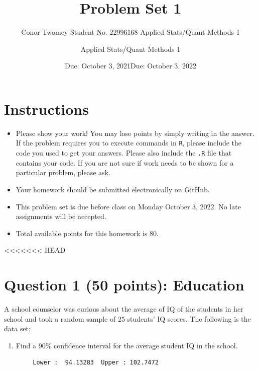 \documentclass[12pt,letterpaper]{article}
\title{Problem Set 1}
\date{Due: October 3, 2021}
\author{Conor Twomey Student No. 22996168
	 Applied Stats/Quant Methods 1}
\date{Due: October 3, 2022}
\author{Applied Stats/Quant Methods 1}
\begin{document}
	\maketitle
	
	\section*{Instructions}
	\begin{itemize}
		\item Please show your work! You may lose points by simply writing in the answer. If the problem requires you to execute commands in \texttt{R}, please include the code you used to get your answers. Please also include the \texttt{.R} file that contains your code. If you are not sure if work needs to be shown for a particular problem, please ask.
		\item Your homework should be submitted electronically on GitHub.
		\item This problem set is due before class on Monday October 3, 2022. No late assignments will be accepted.
		\item Total available points for this homework is 80.
	\end{itemize}
	
	\vspace{1cm}
<<<<<<< HEAD
	\section*{Question 1 (50 points): Education}
	
	A school counselor was curious about the average of IQ of the students in her school and took a random sample of 25 students' IQ scores. The following is the data set:\\
	\vspace{.5cm}
	
	\vspace{1cm}
	
	\begin{enumerate}
		\item Find a 90\% confidence interval for the average student IQ in the school.\\
	\end{enumerate}



\begin{verbatim}
	    Lower :  94.13283  Upper : 102.7472
\end{verbatim}
\end{document}
